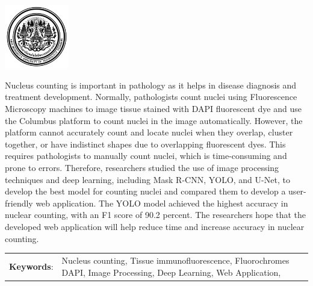 \documentclass[12pt,oneside,openright,a4paper]{cpe-thai-project}
\begin{document}
\pdfstringdefDisableCommands{%
\let\MakeUppercase\relax
}

\begin{center}
  \includegraphics[width=2.8cm]{logo02.jpg}
\end{center}
\vspace*{-1cm}

\maketitlepage
\makesignaturepage 

\abstract

Nucleus counting is important in pathology as it helps in disease diagnosis and treatment development. Normally, pathologists count nuclei using Fluorescence Microscopy machines to image tissue stained with DAPI fluorescent dye and use the Columbus platform to count nuclei in the image automatically. However, the platform cannot accurately count and locate nuclei when they overlap, cluster together, or have indistinct shapes due to overlapping fluorescent dyes. This requires pathologists to manually count nuclei, which is time-consuming and prone to errors. Therefore, researchers studied the use of image processing techniques and deep learning, including Mask R-CNN, YOLO, and U-Net, to develop the best model for counting nuclei and compared them to develop a user-friendly web application. The YOLO model achieved the highest accuracy in nuclear counting, with an F1 score of 90.2 percent. The researchers hope that the developed web application will help reduce time and increase accuracy in nuclear counting.


\begin{flushleft}
\begin{tabular*}{\textwidth}{@{}lp{}}
\textbf{Keywords}: & Nucleus counting, Tissue immunofluorescence, Fluorochromes DAPI, Image Processing, Deep Learning, Web Application,
\end{tabular*}
\end{flushleft}
\endabstract
\end{document}
